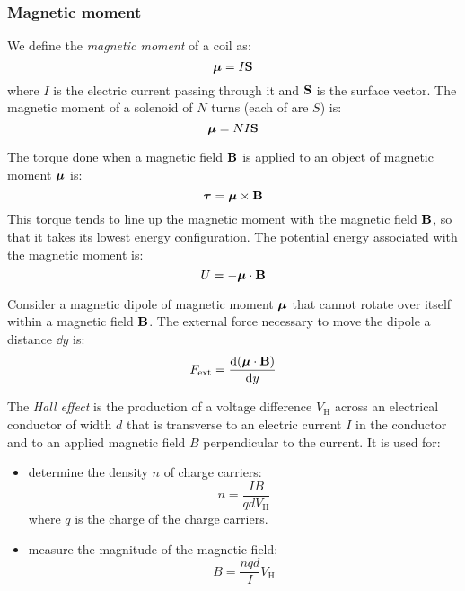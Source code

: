 \documentclass[../../../main.tex]{subfiles}
\begin{document}
\begin{multicols}{2}
  \subsubsection{Magnetic moment}
  \begin{definition}
    We define the \textit{magnetic moment} of a coil as: $$\vb*{\mu}=I\boldsymbol{\mathrm{S}}$$ where $I$ is the electric current passing through it and $\boldsymbol{\mathrm{S}}$ is the surface vector. The magnetic moment of a solenoid of $N$ turns (each of are $S$) is: $$\vb*{\mu}=NI\boldsymbol{\mathrm{S}}$$
  \end{definition}
  \begin{prop}
    The torque done when a magnetic field $\boldsymbol{\mathrm{B}}$ is applied to an object of magnetic moment $\vb*{\mu}$ is: $$\vb*{\tau}=\vb*{\mu}\times\boldsymbol{\mathrm{B}}$$ This torque tends to line up the magnetic moment with the magnetic field $\boldsymbol{\mathrm{B}}$, so that it takes its lowest energy configuration. The potential energy associated with the magnetic moment is: $$U=-\vb*{\mu}\cdot\boldsymbol{\mathrm{B}}$$
  \end{prop}
  \begin{prop}
    Consider a magnetic dipole of magnetic moment $\vb*{\mu}$ that cannot rotate over itself within a magnetic field $\boldsymbol{\mathrm{B}}$. The external force necessary to move the dipole a distance $\dd y$ is: $$F_\text{ext}=\dv{(\vb*{\mu}\cdot\boldsymbol{\mathrm{B}})}{y}$$
  \end{prop}
  \begin{prop}
    The \textit{Hall effect} is the production of a voltage difference $V_\text{H}$ across an electrical conductor of width $d$ that is transverse to an electric current $I$ in the conductor and to an applied magnetic field $B$ perpendicular to the current.
    It is used for:
    \begin{itemize}
      \item determine the density $n$ of charge carriers: $$n=\frac{IB}{qdV_\text{H}}$$ where $q$ is the charge of the charge carriers.
      \item measure the magnitude of the magnetic field: $$B=\frac{nqd}{I}V_\text{H}$$
    \end{itemize}
  \end{prop}
  \begin{center}
    \begin{minipage}{\linewidth}
      \centering
      
    \end{minipage}
  \end{center}

\end{multicols}
\end{document}
